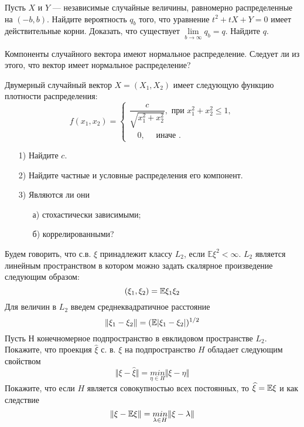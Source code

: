 


\begin{problem}
Пусть $X$ и $Y$ --- независимые случайные величины, равномерно распределенные на $(-b,b)$. 
Найдите вероятность $q_b$ того, что уравнение $t^2+tX+Y=0$ имеет действительные корни. Доказать, что 
существует $\lim\limits_{b\to\infty} q_b=q$. Найдите $q$. 
\end{problem}


\begin{problem}
Компоненты случайного вектора имеют нормальное распределение. Следует ли из этого, что вектор имеет нормальное распределение? 
\end{problem}

\begin{problem}
Двумерный случайный вектор $X=(X_1,X_2)$  имеет следующую функцию плотности распределения: 
$$
f(x_1,x_2)=\begin{cases}
\dfrac{c}{\sqrt{x_1^2+x_2^2}}, \text{ при } x_1^2+x_2^2\leqslant 1 , \\
\quad 0, \quad\text{ иначе }. 
\end{cases}
$$
\begin{enumerate}
\item[1)] Найдите $c$. 
\item[2)] Найдите частные и условные распределения его компонент. 
\item[3)] Являются ли они 
\begin{enumerate}
\item[а)] стохастически зависимыми; 
\item[б)] коррелированными? 
\end{enumerate}
\end{enumerate}
\end{problem}

\begin{problem}
Будем говорить, что  с.в. $\xi$ принадлежит классу $L_2$, если ${\mathbb E}\xi^2<\infty$. $L_2$ является линейным пространством в котором можно задать скалярное произведение следующим образом:
\[
(\xi_1, \xi_2) = \mathrm{{\mathbb E}}{\xi_1 \xi_2}
\]
Для величин в $L_2$ введем среднеквадратичное расстояние
\[
\Vert \xi_1 - \xi_2 \Vert = (\mathrm{{\mathbb E}}{|\xi_1 - \xi_2|})^{1/2}
\]
Пусть $Н$ конечномерное  подпространство в евклидовом пространстве  $L_2$.
Покажите, что проекция $\widehat{\xi}$ с. в. $\xi$ на подпространство $H$ обладает следующим свойством  
\[
\Vert \xi - \widehat{\xi} \Vert = \underset{\eta \in H}{min} \Vert \xi - \eta \Vert
\]
Покажите, что если $H$ является совокупностью всех постоянных, то 
$\widehat{\xi}  = \mathrm{{\mathbb E}}{\xi}$ и как следствие 
\[
\Vert \xi - \mathrm{{\mathbb E}}{\xi} \Vert = \underset{\lambda \in H}{min} \Vert \xi - \lambda \Vert
\] 
\end{problem}

